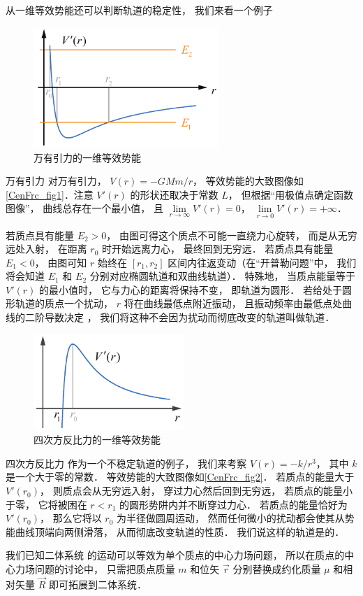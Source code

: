 从一维等效势能还可以判断轨道的稳定性， 我们来看一个例子

\begin{figure}[ht]
\centering
\includegraphics[width=7cm]{./figures/CenFrc1.pdf}
\caption{万有引力的一维等效势能} \label{CenFrc_fig1}
\end{figure}

\begin{exam}{万有引力}
对万有引力， $V(r) = -GMm/r$， 等效势能的大致图像如\autoref{CenFrc_fig1}．注意 $V'(r)$ 的形状还取决于常数 $L$， 但根据“用极值点确定函数图像”， 曲线总存在一个最小值， 且 $\lim\limits_{r\to\infty}V'(r) = 0$， $\lim\limits_{r\to 0} V'(r) = +\infty$．

若质点具有能量 $E_2 > 0$， 由图可得这个质点不可能一直绕力心旋转， 而是从无穷远处入射， 在距离 $r_0$ 时开始远离力心， 最终回到无穷远． 若质点具有能量 $E_1 < 0$， 由图可知 $r$ 始终在 $[r_1, r_2]$ 区间内往返变动（在“开普勒问题”中， 我们将会知道 $E_1$ 和 $E_2$ 分别对应椭圆轨道和双曲线轨道）． 特殊地， 当质点能量等于 $V'(r)$ 的最小值时， 它与力心的距离将保持不变， 即轨道为圆形． 若给处于圆形轨道的质点一个扰动， $r$ 将在曲线最低点附近振动， 且振动频率由最低点处曲线的二阶导数决定%
， 我们将这种不会因为扰动而彻底改变的轨道叫做轨道．
\end{exam}

\begin{figure}[ht]
\centering
\includegraphics[width=5.7cm]{./figures/CenFrc2.pdf}
\caption{四次方反比力的一维等效势能} \label{CenFrc_fig2}
\end{figure}

\begin{exam}{四次方反比力}
作为一个不稳定轨道的例子， 我们来考察 $V(r) = -k/r^3$， 其中 $k$ 是一个大于零的常数． 等效势能的大致图像如\autoref{CenFrc_fig2}． 若质点的能量大于 $V'(r_0)$， 则质点会从无穷远入射， 穿过力心然后回到无穷远， 若质点的能量小于零， 它将被困在 $r < r_1$ 的圆形势阱内并不断穿过力心． 若质点的能量恰好为 $V'(r_0)$， 那么它将以 $r_0$ 为半径做圆周运动， 然而任何微小的扰动都会使其从势能曲线顶端向两侧滑落， 从而彻底改变轨道的性质． 我们说这样的轨道是的．
\end{exam}

我们已知二体系统 的运动可以等效为单个质点的中心力场问题， 所以在质点的中心力场问题的讨论中， 只需把质点质量 $m$ 和位矢 $\vec r$ 分别替换成约化质量 $\mu$ 和相对矢量 $\vec R$ 即可拓展到二体系统．

